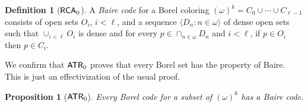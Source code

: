 \documentclass{amsart}
\newtheorem{prop}[thm]{Proposition}
\theoremstyle{definition}
\newtheorem{defn}[thm]{Definition}
\theoremstyle{remark}
\newcommand{\system}[1]{\mbox{\fontfamily{cmss}\fontshape{n}\fontseries{m}%
    \selectfont#1}}
\newcommand{\RCA}{\system{RCA}\ensuremath{_0}}
\newcommand{\ATR}{\system{ATR}\ensuremath{_0}}
\begin{document}
\begin{defn}[$\RCA$]
A \textit{Baire code} for a Borel coloring $(\omega)^k = C_0 \cup \cdots \cup C_{\ell-1}$ consists of open sets $O_i$, $i < \ell$, and a sequence 
$\langle D_n : n \in \omega \rangle$ of dense open sets such that $\cup_{i < \ell} O_i$ is dense and for every $p \in \cap_{n \in \omega} D_n$ and $i < \ell$, if 
$p \in O_i$ then $p \in C_i$.
\end{defn}

We confirm that $\ATR$ proves that every 
Borel set has the property of Baire.  This is just an effectivization of
the usual proof.

\begin{prop}[$\ATR$]
\label{prop:BP}
Every Borel code for a subset of $(\omega)^k$ has a Baire code. 
\end{prop}
\end{document}
